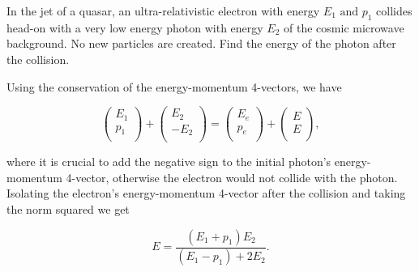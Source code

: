 \documentclass[english,a4paper,12pt]{report}
\begin{document}
{In the jet of a quasar, an ultra-relativistic electron with energy \(E_1 \text { and } p_1 \)  collides head-on with a very low energy photon with energy \(E_2 \) of the cosmic microwave background. No new particles are created. Find the energy of the photon after the collision. }
{Using the conservation of the energy-momentum 4-vectors, we have 

\begin{equation}
    \begin{pmatrix}
         E_1  \\
         p_1  \\
    \end{pmatrix} + \begin{pmatrix}
         E_2  \\
         -E_2  \\
    \end{pmatrix}  = \begin{pmatrix}
         E_{e}  \\
         p_{e}  \\
    \end{pmatrix} + \begin{pmatrix}
         E \\
         E \\
    \end{pmatrix},
\end{equation}

where it is crucial to add the negative sign to the initial photon's energy-momentum 4-vector, otherwise the electron would not collide with the photon. Isolating the electron's energy-momentum 4-vector after the collision and taking the norm squared we get 

\begin{equation}
    E = \frac{(E_1 +p_1 )E_2 }{(E_1 - p_1 )+2E_2 }. 
\end{equation}
~
} 
\end{document}
